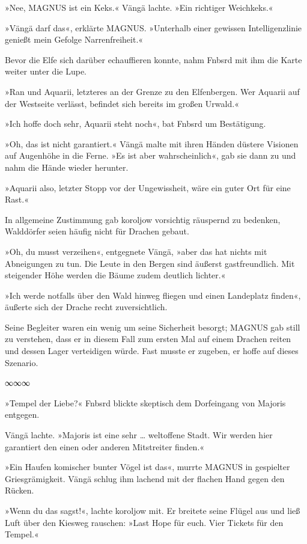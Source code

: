 »Nee, MAGNUS ist ein Keks.« Vängä lachte. »Ein richtiger Weichkeks.«

»Vängä darf das«, erklärte MAGNUS. »Unterhalb einer gewissen Intelligenzlinie genießt mein Gefolge Narrenfreiheit.«

Bevor die Elfe sich darüber echauffieren konnte, nahm Fnbsrd mit ihm die Karte weiter unter die Lupe.

»Ran und Aquarii, letzteres an der Grenze zu den Elfenbergen. Wer Aquarii auf der Westseite verlässt, befindet sich bereits im großen Urwald.«

»Ich hoffe doch sehr, Aquarii steht noch«, bat Fnbsrd um Bestätigung.

»Oh, das ist nicht garantiert.« Vängä malte mit ihren Händen düstere Visionen auf Augenhöhe in die Ferne. »Es ist aber wahrscheinlich«, gab sie dann zu und nahm die Hände wieder herunter.

»Aquarii also, letzter Stopp vor der Ungewissheit, wäre ein guter Ort für eine Rast.«

In allgemeine Zustimmung gab koroljow vorsichtig räuspernd zu bedenken, Walddörfer seien häufig nicht für Drachen gebaut.

»Oh, du musst verzeihen«, entgegnete Vängä, »aber das hat nichts mit Abneigungen zu tun. Die Leute in den Bergen sind äußerst gastfreundlich. Mit steigender Höhe werden die Bäume zudem deutlich lichter.«

»Ich werde notfalls über den Wald hinweg fliegen und einen Landeplatz finden«, äußerte sich der Drache recht zuversichtlich.

Seine Begleiter waren ein wenig um seine Sicherheit besorgt; MAGNUS gab still zu verstehen, dass er in diesem Fall zum ersten Mal auf einem Drachen reiten und dessen Lager verteidigen würde. Fast musste er zugeben, er hoffe auf dieses Szenario.

\begin{center}
∞∞∞
\end{center}

»Tempel der Liebe?« Fnbsrd blickte skeptisch dem Dorfeingang von Majoris entgegen.

Vängä lachte. »Majoris ist eine sehr … weltoffene Stadt. Wir werden hier garantiert den einen oder anderen Mitstreiter finden.«

»Ein Haufen komischer bunter Vögel ist das«, murrte MAGNUS in gespielter Griesgrämigkeit. Vängä schlug ihm lachend mit der flachen Hand gegen den Rücken.

»Wenn du das sagst!«, lachte koroljow mit. Er breitete seine Flügel aus und ließ Luft über den Kiesweg rauschen: »Last Hope für euch. Vier Tickets für den Tempel.«

